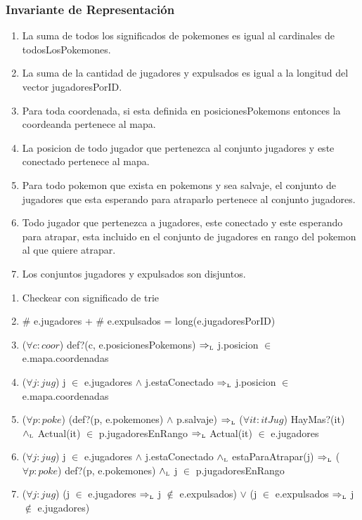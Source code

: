 \begin{Representacion}
\subsubsection{Invariante de Representación}
	\begin{enumerate}
		\item La suma de todos los significados de pokemones es igual al cardinales de  todosLosPokemones.
		\item La suma de la cantidad de jugadores y expulsados es igual a la longitud del vector jugadoresPorID.
		\item Para toda coordenada, si esta definida en posicionesPokemons entonces la coordeanda pertenece al mapa.
		\item La posicion de todo jugador que pertenezca al conjunto jugadores y este conectado pertenece al mapa.
		\item Para todo pokemon que exista en pokemons y sea salvaje, el conjunto de jugadores que esta esperando para atraparlo pertenece al conjunto jugadores.
		\item Todo jugador que pertenezca a jugadores, este conectado y este esperando para atrapar, esta incluido en el conjunto de jugadores en rango del pokemon al que quiere atrapar.
		\item Los conjuntos jugadores y expulsados son disjuntos.
	\end{enumerate}
	
	\begin{enumerate}
		\item Checkear con significado de trie
		\item \# e.jugadores + \# e.expulsados = long(e.jugadoresPorID)
		\item ($\forall c : coor$) def?(c, e.posicionesPokemons) $\Rightarrow_{\mathrm{\scriptscriptstyle{L}}}$ j.posicion $\in$ e.mapa.coordenadas
		\item ($\forall j : jug$) j $\in$ e.jugadores $\land$ j.estaConectado $\Rightarrow_{\mathrm{\scriptscriptstyle{L}}}$ j.posicion $\in$ e.mapa.coordenadas
		\item ($\forall p : poke$) (def?(p, e.pokemones) $\land$ p.salvaje) $\Rightarrow_{\mathrm{\scriptscriptstyle{L}}}$ ($\forall it : itJug$) HayMas?(it) $\land_{\mathrm{\scriptscriptstyle{L}}}$ Actual(it) $\in$ p.jugadoresEnRango $\Rightarrow_{\mathrm{\scriptscriptstyle{L}}}$ Actual(it) $\in$ e.jugadores
		\item ($\forall j : jug$) j $\in$ e.jugadores $\land$ j.estaConectado $\land_{\mathrm{\scriptscriptstyle{L}}}$ estaParaAtrapar(j) $\Rightarrow_{\mathrm{\scriptscriptstyle{L}}}$ ($\forall p : poke$) def?(p, e.pokemones) $\land_{\mathrm{\scriptscriptstyle{L}}}$ j $\in$ p.jugadoresEnRango
		\item ($\forall j : jug$) (j $\in$ e.jugadores $\Rightarrow_{\mathrm{\scriptscriptstyle{L}}}$ j $\notin$ e.expulsados) $\lor$ (j $\in$ e.expulsados $\Rightarrow_{\mathrm{\scriptscriptstyle{L}}}$ j $\notin$ e.jugadores)
		

\end{enumerate}
\end{Representacion}
